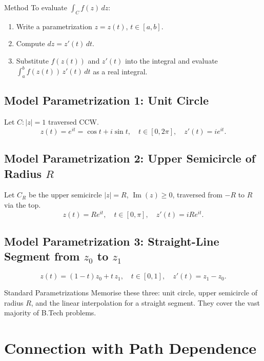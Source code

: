 \documentclass[12pt,a4paper]{article}
\begin{document}
\begin{infobox}{Method}
To evaluate $\int_C f(z)\,dz$:
\begin{enumerate}[leftmargin=1.8em]
  \item Write a parametrization $z = z(t)$, $t \in [a,b]$.
  \item Compute $dz = z'(t)\,dt$.
  \item Substitute $f(z(t))$ and $z'(t)$ into the integral and evaluate
        $\int_a^b f(z(t))\,z'(t)\,dt$ as a real integral.
\end{enumerate}
\end{infobox}

\subsection*{Model Parametrization 1: Unit Circle}

Let $C : |z| = 1$ traversed CCW.
\[
  z(t) = e^{it} = \cos t + i\sin t, \quad t \in [0,2\pi], \quad z'(t) = ie^{it}.
\]

\subsection*{Model Parametrization 2: Upper Semicircle of Radius $R$}

Let $C_R$ be the upper semicircle $|z|=R$, $\operatorname{Im}(z)\ge 0$,
traversed from $-R$ to $R$ via the top.
\[
  z(t) = Re^{it}, \quad t \in [0,\pi], \quad z'(t) = iRe^{it}.
\]

\subsection*{Model Parametrization 3: Straight-Line Segment from $z_0$ to $z_1$}

\[
  z(t) = (1-t)z_0 + t\,z_1, \quad t \in [0,1], \quad z'(t) = z_1 - z_0.
\]

\begin{learnbox}{Standard Parametrizations}
Memorise these three: unit circle, upper semicircle of radius $R$, and the linear
interpolation for a straight segment. They cover the vast majority of B.Tech problems.
\end{learnbox}

\section{Connection with Path Dependence}
\end{document}
